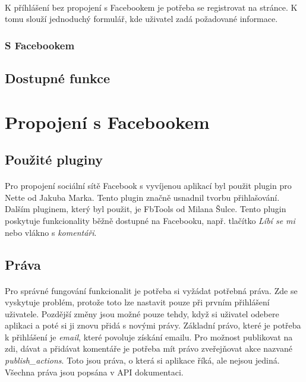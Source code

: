 \documentclass[11pt,a4paper,titlepage,oneside]{book}
\begin{document}
					\paragraph{} K příhlášení bez propojení s Facebookem je potřeba se registrovat na stránce. K tomu slouží jednoduchý formulář, kde uživatel zadá požadované informace.
				\subsubsection{S Facebookem}
					\paragraph{}
			\subsection{Dostupné funkce}
				\paragraph{}

		\section{Propojení s Facebookem}
			\subsection{Použité pluginy}
				\paragraph{} Pro propojení sociální sítě Facebook s vyvíjenou aplikací byl použit plugin pro Nette\cite{nette20login} od Jakuba Marka. Tento plugin značně usnadnil tvorbu přihlašování. Dalším pluginem, který byl použit, je FbTools\cite{FbTools} od Milana Šulce. Tento plugin poskytuje funkcionality běžně dostupné na Facebooku, např. tlačítko \textit{Líbí se mi} nebo vlákno s \textit{komentáři}.
			\subsection{Práva}
				\paragraph{} Pro správné fungování funkcionalit je potřeba si vyžádat potřebná  práva. Zde se vyskytuje problém, protože toto lze nastavit pouze při prvním přihlášení uživatele. Pozdější změny jsou možné pouze tehdy, když si uživatel odebere aplikaci a poté si ji znovu přidá s novými právy. Základní právo, které je potřeba k přihlášení je \textit{email}, které povoluje získání emailu. Pro možnost publikovat na zdi, dávat  a přidávat komentáře je potřeba mít právo zveřejňovat akce nazvané \textit{publish\_actions}. Toto jsou práva, o která si aplikace říká, ale nejsou jediná. Všechna práva jsou popsána v API dokumentaci\cite{FbApiPrava}.
\end{document}
